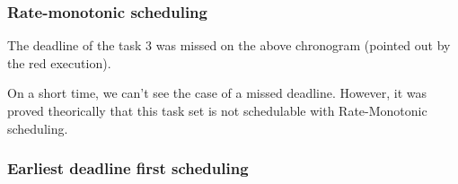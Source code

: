 \subsubsection{Rate-monotonic scheduling}

\begin{RTGrid}[width=10cm]{3}{20}







\end{RTGrid}

The deadline of the task 3 was missed on the above chronogram (pointed out by the red execution). \\

\begin{RTGrid}[width=10cm]{3}{22}







\end{RTGrid}

On a short time, we can't see the case of a missed deadline. However, it was proved theorically that this task set is not schedulable with Rate-Monotonic scheduling.

\subsubsection{Earliest deadline first scheduling}
